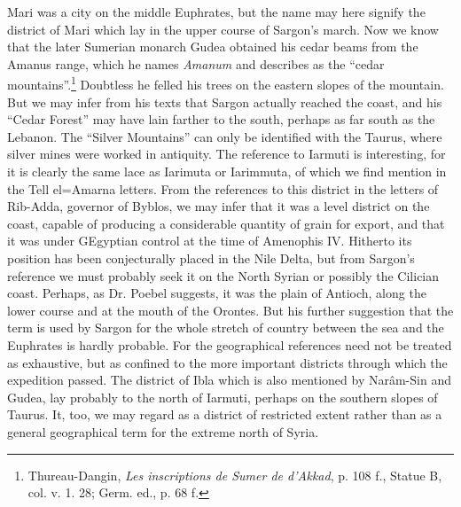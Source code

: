 \documentclass[12pt,oneside]{book}
\begin{document}
Mari was a city on the middle Euphrates, but the name may here signify the district of Mari which lay in the upper course of Sargon's march. Now we know that the later Sumerian monarch Gudea obtained his cedar beams from the Amanus range, which he names \textit{Amanum} and describes as the ``cedar mountains''.\footnote{Thureau-Dangin, \textit{Les inscriptions de Sumer de d'Akkad}, p. 108 f., Statue B, col. v. 1. 28; Germ. ed., p. 68 f.} Doubtless he felled his trees on the eastern slopes of the mountain. But we may infer from his texts that Sargon actually reached the coast, and his ``Cedar Forest'' may have lain farther to the south, perhaps as far south as the Lebanon. The ``Silver Mountains'' can only be identified with the Taurus, where silver mines were worked in antiquity. The reference to Iarmuti is interesting, for it is clearly the same lace as Iarimuta or Iarimmuta, of which we find mention in the Tell el=Amarna letters. From the references to this district in the letters of Rib-Adda, governor of Byblos, we may infer that it was a level district on the coast, capable of producing a considerable quantity of grain for export, and that it was under GEgyptian control at the time of Amenophis IV. Hitherto its position has been conjecturally placed in the Nile Delta, but from Sargon's reference we must probably seek it on the North Syrian or possibly the Cilician coast. Perhaps, as Dr. Poebel suggests, it was the plain of Antioch, along the lower course and at the mouth of the Orontes. But his further suggestion that the term is used by Sargon for the whole stretch of country between the sea and the Euphrates is hardly probable. For the geographical references need not be treated as exhaustive, but as confined to the more important districts through which the expedition passed. The district of Ibla which is also mentioned by Nar\^am-Sin and Gudea, lay probably to the north of Iarmuti, perhaps on the southern slopes of Taurus. It, too, we may regard as a district of restricted extent rather than as a general geographical term for the extreme north of Syria. \par 
\end{document}

